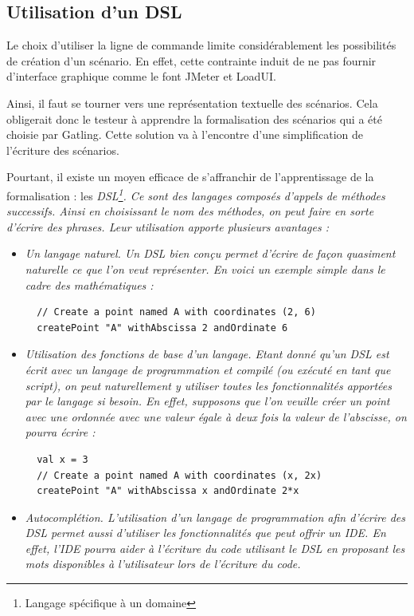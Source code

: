 \subsection{Utilisation d'un DSL}
Le choix d'utiliser la ligne de commande limite considérablement les possibilités de création d'un scénario. En effet, cette contrainte induit de ne pas fournir d'interface graphique comme le font JMeter et LoadUI.

Ainsi, il faut se tourner vers une représentation textuelle des scénarios. Cela obligerait donc le testeur à apprendre la formalisation des scénarios qui a été choisie par Gatling. Cette solution va à l'encontre d'une simplification de l'écriture des scénarios.

Pourtant, il existe un moyen efficace de s'affranchir de l'apprentissage de la formalisation : les \em{DSL}\footnote{ Langage spécifique à un domaine}. Ce sont des langages composés d'appels de méthodes successifs. Ainsi en choisissant le nom des méthodes, on peut faire en sorte d'écrire des phrases. Leur utilisation apporte plusieurs avantages :

\begin{itemize}
  \item \em{Un langage naturel}. Un DSL bien conçu permet d'écrire de façon quasiment naturelle ce que l'on veut représenter. En voici un exemple simple dans le cadre des mathématiques :
  \begin{lstlisting}
  // Create a point named A with coordinates (2, 6)
  createPoint "A" withAbscissa 2 andOrdinate 6
  \end{lstlisting}
  \item \em{Utilisation des fonctions de base d'un langage}. Etant donné qu'un DSL est écrit avec un langage de programmation et compilé (ou exécuté en tant que script), on peut naturellement y utiliser toutes les fonctionnalités apportées par le langage si besoin. En effet, supposons que l'on veuille créer un point avec une ordonnée avec une valeur égale à deux fois la valeur de l'abscisse, on pourra écrire :
  \begin{lstlisting}
  val x = 3
  // Create a point named A with coordinates (x, 2x)
  createPoint "A" withAbscissa x andOrdinate 2*x
  \end{lstlisting}
  \item \em{Autocomplétion}. L'utilisation d'un langage de programmation afin d'écrire des DSL permet aussi d'utiliser les fonctionnalités que peut offrir un IDE. En effet, l'IDE pourra aider à l'écriture du code utilisant le DSL en proposant les mots disponibles à l'utilisateur lors de l'écriture du code.
\end{itemize}


